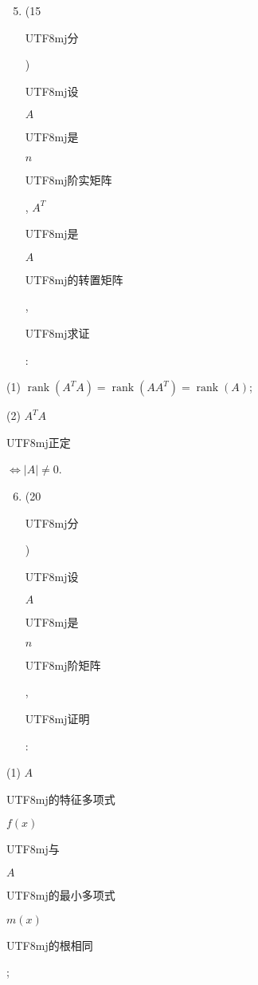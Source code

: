 \documentclass[10pt]{article}
\begin{document}
\begin{enumerate}
  \setcounter{enumi}{4}
  \item (15 \begin{CJK}{UTF8}{mj}分\end{CJK}) \begin{CJK}{UTF8}{mj}设\end{CJK} $A$ \begin{CJK}{UTF8}{mj}是\end{CJK} $n$ \begin{CJK}{UTF8}{mj}阶实矩阵\end{CJK}, $A^{T}$ \begin{CJK}{UTF8}{mj}是\end{CJK} $A$ \begin{CJK}{UTF8}{mj}的转置矩阵\end{CJK}, \begin{CJK}{UTF8}{mj}求证\end{CJK}:
\end{enumerate}
(1) $\operatorname{rank}\left(A^{T} A\right)=\operatorname{rank}\left(A A^{T}\right)=\operatorname{rank}(A)$;

(2) $A^{T} A$ \begin{CJK}{UTF8}{mj}正定\end{CJK} $\Leftrightarrow|A| \neq 0$.

\begin{enumerate}
  \setcounter{enumi}{5}
  \item (20 \begin{CJK}{UTF8}{mj}分\end{CJK}) \begin{CJK}{UTF8}{mj}设\end{CJK} $A$ \begin{CJK}{UTF8}{mj}是\end{CJK} $n$ \begin{CJK}{UTF8}{mj}阶矩阵\end{CJK}, \begin{CJK}{UTF8}{mj}证明\end{CJK}:
\end{enumerate}
(1) $A$ \begin{CJK}{UTF8}{mj}的特征多项式\end{CJK} $f(x)$ \begin{CJK}{UTF8}{mj}与\end{CJK} $A$ \begin{CJK}{UTF8}{mj}的最小多项式\end{CJK} $m(x)$ \begin{CJK}{UTF8}{mj}的根相同\end{CJK};
\end{document}
